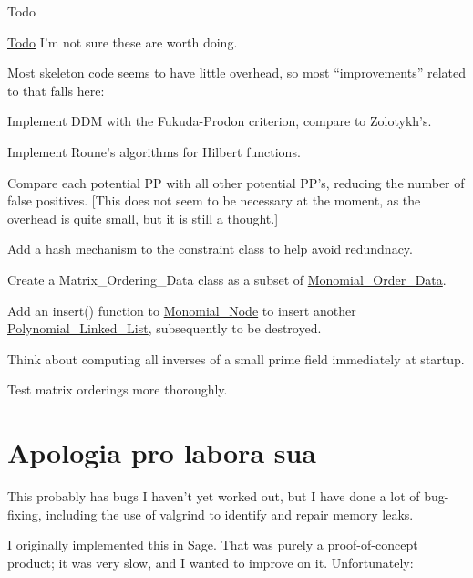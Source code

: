\begin{DoxyRefDesc}{Todo}
\item[\hyperlink{todo__todo000003}{Todo}]I'm not sure these are worth doing.
\begin{DoxyItemize}
\item Most skeleton code seems to have little overhead, so most ``improvements'' related to that falls here\+:
\begin{DoxyItemize}
\item Implement D\+DM with the Fukuda-\/\+Prodon criterion, compare to Zolotykh's.
\item Implement Roune's algorithms for Hilbert functions.
\item Compare each potential PP with all other potential PP's, reducing the number of false positives. \mbox{[}This does not seem to be necessary at the moment, as the overhead is quite small, but it is still a thought.\mbox{]}
\item Add a hash mechanism to the {\ttfamily constraint} class to help avoid redundnacy.
\end{DoxyItemize}
\item Create a Matrix\+\_\+\+Ordering\+\_\+\+Data class as a subset of \hyperlink{group__orderinggroup_class_monomial___order___data}{Monomial\+\_\+\+Order\+\_\+\+Data}.
\item Add an {\ttfamily insert()} function to \hyperlink{group__polygroup_class_monomial___node}{Monomial\+\_\+\+Node} to insert another \hyperlink{group__polygroup_class_polynomial___linked___list}{Polynomial\+\_\+\+Linked\+\_\+\+List}, subsequently to be destroyed.
\item Think about computing all inverses of a small prime field immediately at startup.
\item Test matrix orderings more thoroughly.
\end{DoxyItemize}\end{DoxyRefDesc}
\hypertarget{index_Apologia}{}\section{Apologia pro labora sua}\label{index_Apologia}
This probably has bugs I haven't yet worked out, but I have done a lot of bug-\/fixing, including the use of {\ttfamily valgrind} to identify and repair memory leaks.

I originally implemented this in Sage. That was purely a proof-\/of-\/concept product; it was very slow, and I wanted to improve on it. Unfortunately\+:

